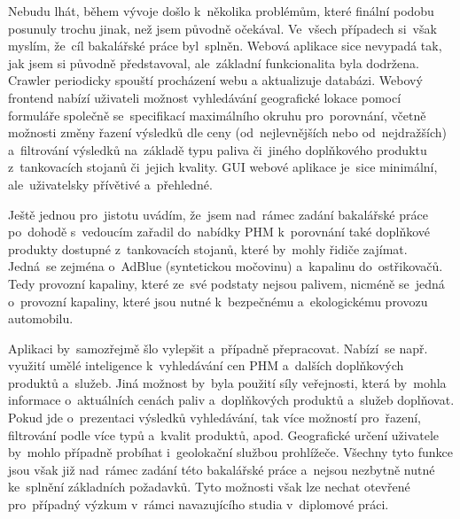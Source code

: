 \begin{enumerate}
        Nebudu lhát, během vývoje došlo k~několika problémům, které
        finální podobu posunuly trochu jinak, než jsem původně očekával.
        Ve~všech případech si~však myslím, že~cíl bakalářské práce
        byl~splněn. Webová aplikace sice nevypadá tak, jak jsem si
        původně představoval, ale~základní funkcionalita byla dodržena.
        Crawler periodicky spouští procházení webu a aktualizuje databázi.
        Webový frontend nabízí uživateli možnost vyhledávání geografické
        lokace pomocí formuláře společně se~specifikací maximálního okruhu
        pro~porovnání, včetně možnosti změny řazení výsledků dle ceny
        (od~nejlevnějších nebo od~nejdražších) a~filtrování výsledků
        na~základě typu paliva či~jiného doplňkového produktu z~tankovacích
        stojanů či~jejich kvality. GUI webové aplikace je~sice minimální,
        ale~uživatelsky přívětivé a~přehledné.
\end{enumerate}

Ještě jednou pro~jistotu uvádím, že~jsem nad~rámec zadání bakalářské práce
po~dohodě s~vedoucím zařadil do~nabídky PHM k~porovnání také doplňkové
produkty dostupné z~tankovacích stojanů, které by~mohly řidiče zajímat.
Jedná~se zejména o~AdBlue (syntetickou močovinu) a~kapalinu do~ostřikovačů.
Tedy provozní kapaliny, které ze~své podstaty nejsou palivem, nicméně se~jedná
o~provozní kapaliny, které jsou nutné k~bezpečnému a~ekologickému provozu
automobilu.

Aplikaci by~samozřejmě šlo vylepšit a~případně přepracovat. Nabízí~se např.
využití umělé inteligence k~vyhledávání cen PHM a~dalších doplňkových
produktů a~služeb. Jiná možnost by~byla použití síly veřejnosti, která
by~mohla informace o~aktuálních cenách paliv a~doplňkových produktů a~služeb
doplňovat. Pokud jde o~prezentaci výsledků vyhledávání, tak více možností
pro~řazení, filtrování podle více typů a~kvalit produktů, apod. Geografické
určení uživatele by~mohlo případně probíhat i~geolokační službou prohlížeče.
Všechny tyto funkce jsou však již nad~rámec zadání této bakalářské práce
a~nejsou nezbytně nutné ke~splnění základních požadavků. Tyto možnosti však
lze nechat otevřené pro~případný výzkum v~rámci navazujícího studia
v~diplomové práci.

\endinput
